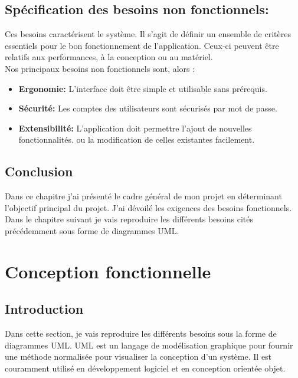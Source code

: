 \documentclass[12pt,a4paper]{report}
\begin{document}
		\section{Spécification des besoins non fonctionnels:}		
Ces besoins caractérisent le système. Il s’agit de définir un ensemble de critères essentiels
pour le bon fonctionnement de l’application. Ceux-ci peuvent être relatifs aux performances, à la
conception ou au matériel.\\
Nos principaux besoins non fonctionnels sont, alors :\\
			\begin{itemize}
				\item \textbf{Ergonomie:} L’interface doit être simple et utilisable sans prérequis.
				\item \textbf{Sécurité:} Les comptes des utilisateurs sont sécurisés par mot de passe.
				\item \textbf{Extensibilité:} L’application doit permettre l’ajout de nouvelles fonctionnalités.
ou la modification de celles existantes facilement.
				\end{itemize}


		\section{Conclusion}
Dans ce chapitre j'ai présenté le cadre général de mon projet en déterminant l’objectif principal du projet. J'ai dévoilé les exigences des besoins fonctionnels. Dans le chapitre suivant je vais reproduire les différents besoins cités précédemment sous forme de diagrammes UML.











	\chapter{Conception fonctionnelle}

		
		\section{Introduction}
Dans cette section, je vais reproduire les différents besoins sous la forme de diagrammes UML.
UML est un langage de modélisation graphique pour fournir une méthode normalisée pour visualiser la conception d'un système. Il est couramment utilisé en développement logiciel et en conception orientée objet.
		
\end{document}
